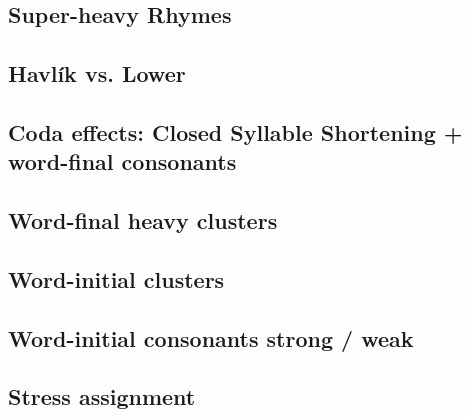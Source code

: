 \subsection{Super-heavy Rhymes}
\subsection{Havlík vs. Lower}
\subsection{Coda effects: Closed Syllable Shortening + word-final consonants}
\subsection{Word-final  heavy clusters}
\subsection{Word-initial  clusters}
\subsection{Word-initial consonants strong / weak}
\subsection{Stress assignment}
